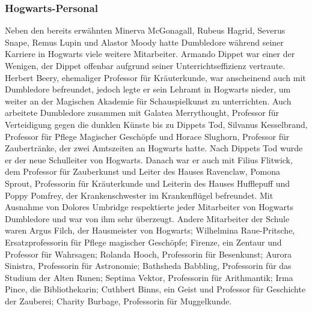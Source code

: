 \documentclass[a4paper, 10pt]{article}
\begin{document}
\subsubsection*{\large Hogwarts-Personal}
Neben den bereits erwähnten Minerva McGonagall, Rubeus Hagrid, Severus Snape, Remus Lupin und Alastor Moody hatte Dumbledore während seiner Karriere in Hogwarts viele weitere Mitarbeiter. Armando Dippet war einer der Wenigen, der Dippet offenbar aufgrund seiner Unterrichtseffizienz vertraute. Herbert Beery, ehemaliger Professor für Kräuterkunde, war anscheinend auch mit Dumbledore befreundet, jedoch legte er sein Lehramt in Hogwarts nieder, um weiter an der Magischen Akademie für Schauspielkunst zu unterrichten. Auch arbeitete Dumbledore zusammen mit Galatea Merrythought, Professor für Verteidigung gegen die dunklen Künste bis zu Dippets Tod, Silvanus Kesselbrand, Professor für Pflege Magischer Geschöpfe und Horace Slughorn, Professor für Zaubertränke, der zwei Amtszeiten an Hogwarts hatte.
\vspace{10pt}
\newline
Nach Dippets Tod wurde er der neue Schulleiter von Hogwarts. Danach war er auch mit Filius Flitwick, dem Professor für Zauberkunst und Leiter des Hauses Ravenclaw, Pomona Sprout, Professorin für Kräuterkunde und Leiterin des Hauses Hufflepuff und Poppy Pomfrey, der Krankenschwester im Krankenflügel befreundet.
\vspace{10pt}
\newline
Mit Ausnahme von Dolores Umbridge respektierte jeder Mitarbeiter von Hogwarts Dumbledore und war von ihm sehr überzeugt. Andere Mitarbeiter der Schule waren Argus Filch, der Hausmeister von Hogwarts; Wilhelmina Raue-Pritsche, Ersatzprofessorin für Pflege magischer Geschöpfe; Firenze, ein Zentaur und Professor für Wahrsagen; Rolanda Hooch, Professorin für Besenkunst; Aurora Sinistra, Professorin für Astronomie; Bathsheda Babbling, Professorin für das Studium der Alten Runen; Septima Vektor, Professorin für Arithmantik; Irma Pince, die Bibliothekarin; Cuthbert Binns, ein Geist und Professor für Geschichte der Zauberei; Charity Burbage, Professorin für Muggelkunde.
\vspace{10pt}
\newline
\end{document}
